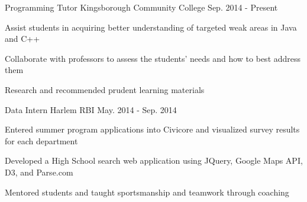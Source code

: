 \begin{cventries}
\iftrue
  \cventry
    {Programming Tutor} %
    {Kingsborough Community College} %
	{Sep. 2014 - Present} %
    {} %
    {
      \begin{cvitems} %
        \item {Assist students in acquiring better understanding of targeted weak areas in Java and C++}
        \item {Collaborate with professors to assess the students’ needs and how to best address them}
        \item {Research and recommended prudent learning materials}
      \end{cvitems}
    }
\fi

\iftrue
  \cventry
    {Data Intern} %
    {Harlem RBI} %
	{May. 2014 - Sep. 2014} %
    {} %
    {
      \begin{cvitems} %
        \item {Entered summer program applications into Civicore and visualized survey results for each department}
        \item {Developed a High School search web application using JQuery, Google Maps API, D3, and Parse.com}
        \item {Mentored students and taught sportsmanship and teamwork through coaching}
      \end{cvitems}
    }
\fi


\end{cventries}
